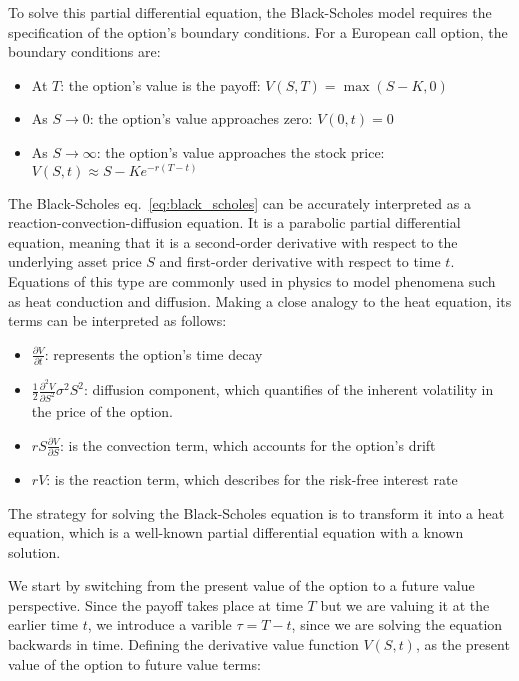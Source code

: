     To solve this partial differential equation, the Black-Scholes model requires the specification of the option's
    boundary conditions.
    For a European call option, the boundary conditions are:
    \begin{itemize}
        \item At \textbf{$T$}: the option's value is the payoff: $V(S, T) = \max(S - K, 0)$
        \item As \textbf{$S \to 0$}: the option's value approaches zero: $V(0, t) = 0$
        \item As \textbf{$S \to \infty$}: the option's value approaches the stock price:
            $V(S, t) \approx S - Ke^{-r\left( T-t \right)}$
        \label{eq:boundary_conditions}
    \end{itemize}

    The Black-Scholes eq.~\ref{eq:black_scholes} can be accurately interpreted as a reaction-convection-diffusion
    equation. It is a parabolic partial differential equation, meaning that it is a second-order derivative with respect
    to the underlying asset price $S$ and first-order derivative with respect to time $t$.
    Equations of this type are commonly used in physics to model phenomena such as heat conduction and diffusion.
    Making a close analogy to the heat equation, its terms can be interpreted as follows:

    \begin{itemize}
        \item $\frac{\partial V}{\partial t}$: represents the option's time decay
        \item $\frac{1}{2} \frac{\partial^2 V}{\partial S^2} \sigma^2 S^2$:
        diffusion component, which quantifies of the inherent volatility in the price of the option.
        \item $r S \frac{\partial V}{\partial S}$: is the convection term, which accounts for the option's drift
        \item $r V$: is the reaction term, which describes for the risk-free interest rate
        \label{eq:bs_terms}
    \end{itemize}

    The strategy for solving the Black-Scholes equation is to transform it into a heat equation,
    which is a well-known partial differential equation with a known solution.


    We start by switching from the present value of the option to a future value perspective.
    Since the payoff takes place at time $T$ but we are valuing it at the earlier time $t$,
    we introduce a varible $\tau = T - t$, since we are solving the equation backwards in time.
    Defining the derivative value function $V(S,t)$, as the present value of the option to future value terms:

